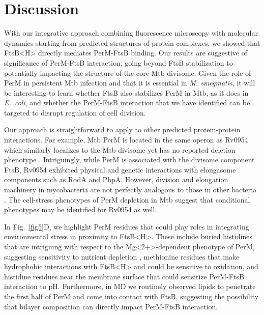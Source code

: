 \documentclass[twocolumn,pdflatex,sn-nature]{sn-jnl}%
\def\textsuperscript#1{<#1>}%
\newcommand\ec{\textit{E.~coli}}
\newcommand\mtb{Mtb}
\newcommand\msmeg{\textit{M. smegmatis}}
\newcommand\ftsbH{FtsB\textsuperscript{H}}
\begin{document}
\section{Discussion}

With our integrative approach combining fluorescence microscopy with molecular dynamics starting from predicted structures of protein complexes, we showed that \ftsbH{} directly mediates PerM-FtsB binding.
Our results are suggestive of significance of PerM-FtsB interaction, going beyond FtsB stabilization \citep{wangPersistentMycobacteriumTuberculosis2019} to potentially impacting the structure of the core \mtb{} divisome.
Given the role of PerM in persistent \mtb{} infection and that it is essential in \msmeg{}, it will be interesting to learn whether FtsB also stabilizes PerM in \mtb{}, as it does in \ec{}, and whether the PerM-FtsB interaction that we have identified can be targeted to disrupt regulation of cell division.

Our approach is straightforward to apply to other predicted protein-protein interactions.
For example, \mtb{} PerM is located in the same operon as Rv0954 which similarly localizes to the \mtb{} divisome yet has no reported deletion phenotype \citep{wangRv0954MemberMycobacterial2021a}.
Intriguingly, while PerM is associated with the divisome component FtsB, Rv0954 exhibited physical and genetic interactions with elongasome components such as RodA and PbpA.
However, division and elongation machinery in mycobacteria are not perfectly analogous to those in other bacteria \cite{baranowskiDreamMycobacterium2019}.
The cell-stress phenotypes of PerM depletion in \mtb{} suggest that conditional phenotypes may be identified for Rv0954 as well.

In Fig.~\ref{fig5}D, we highlight PerM residues that could play roles in integrating environmental stress in proximity to \ftsbH{}.
These include buried histidines that are intriguing with respect to the Mg\textsuperscript{2+}-dependent phenotype of PerM, suggesting sensitivity to nutrient depletion \citep{goodsmithDisruptionTuberculosisMembrane2015}, methionine residues that make hydrophobic interactions with \ftsbH{} and could be sensitive to oxidation, and histidine residues near the membrane surface that could sensitize PerM-FtsB interaction to pH.
Furthermore, in MD we routinely observed lipids to penetrate the first half of PerM and come into contact with FtsB, suggesting the possibility that bilayer composition can directly impact PerM-FtsB interaction.
\end{document}

